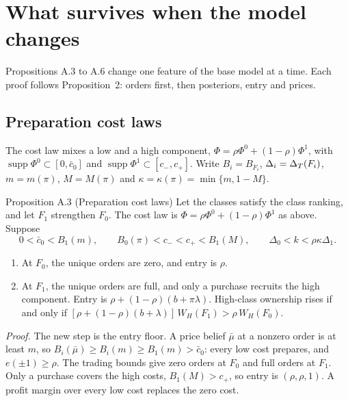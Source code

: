 \chapter{What survives when the model changes}\label{ch:robustness}

\begin{chapterplan}
Propositions A.3 to A.6 change one feature of the base model at a time. Each proof follows Proposition~2: orders
first, then posteriors, entry and prices.
\end{chapterplan}

\section{Preparation cost laws}\label{sec:robustness-costs}

The cost law mixes a low and a high component, \(\Phi=\rho\Phi^0+(1-\rho)\Phi^1\), with
\(\operatorname{supp}\Phi^0\subset[0,\bar c_0]\) and \(\operatorname{supp}\Phi^1\subset[c_-,c_+]\). Write \(B_i=B_{F_i}\),
\(\Delta_i=\Delta_T(F_i)\), \(m=m(\pi)\), \(M=M(\pi)\) and \(\kappa=\kappa(\pi)=\min\{m,1-M\}\).

\begin{paperresult}{Proposition A.3 (Preparation cost laws)}
Let the classes satisfy the class ranking, and let \(F_1\) strengthen \(F_0\). The cost law is
\(\Phi=\rho\Phi^0+(1-\rho)\Phi^1\) as above. Suppose
\[
0<\bar c_0<B_1(m),\qquad B_0(\pi)<c_-<c_+<B_1(M),\qquad \Delta_0<k<\rho\kappa\Delta_1.
\]
\begin{enumerate}[label=(\roman*),leftmargin=2em]
\item At \(F_0\), the unique orders are zero, and entry is \(\rho\).
\item At \(F_1\), the unique orders are full, and only a purchase recruits the high component. Entry is \(\rho+(1-\rho)(b+\pi\lambda)\). High-class ownership rises if and only if \([\rho+(1-\rho)(b+\lambda)]\,W_H(F_1)>\rho\,W_H(F_0)\).
\end{enumerate}
\end{paperresult}

\emph{Proof.} The new step is the entry floor. A price belief \(\bar\mu\) at a nonzero order is at least \(m\), so
\(B_i(\bar\mu)\ge B_i(m)\ge B_1(m)>\bar c_0\): every low cost prepares, and \(e(\pm1)\ge\rho\). The trading bounds give
zero orders at \(F_0\) and full orders at \(F_1\). Only a purchase covers the high costs, \(B_1(M)>c_+\), so entry
is \((\rho,\rho,1)\). A profit margin over every low cost replaces the zero cost.

